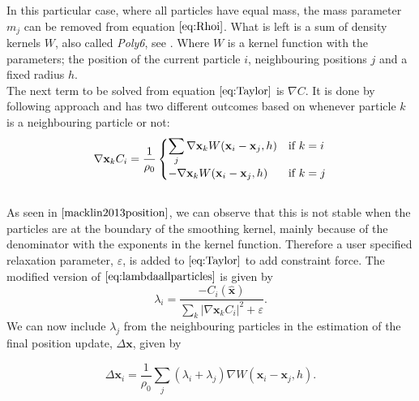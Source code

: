 In this particular case, where all particles have equal mass, the mass parameter $m_j$ can be removed from equation $\ref{eq:Rhoi}$. What is left is a sum of density kernels $W$, also called \textit{Poly6}, see \cite{macklin2013position}. Where $W$ is a kernel function with the parameters; the position of the current particle  $i$, neighbouring positions $j$ and a fixed radius $h$.
\\
The next term to be solved from equation $\ref{eq:Taylor}$ is $\nabla C$. It is done by following \cite{macklin2013position} approach and has two different outcomes based on whenever particle $k$ is a neighbouring particle or not:
\\
\begin{equation}
 \nabla \mathbf{x}_k C_i = \frac{1}{\rho_0}
  \begin{cases}
  \label{eq:NablaC}
   \displaystyle \sum\limits_{j} \nabla \mathbf{x}_k W(\mathbf{x}_i - \mathbf{x}_j, h) & $\text{if }$ k = i \\
   - \nabla \mathbf{x}_k W(\mathbf{x}_i - \mathbf{x}_j, h) & $\text{if }$ k = j \\
  \end{cases}
\end{equation}
\\
As seen in $\cite{macklin2013position}$, we can observe that this is not stable when the particles are at the boundary of the smoothing kernel, mainly because of the denominator with the exponents in the kernel function. 
Therefore a user specified relaxation parameter, $\varepsilon$, is added to $\ref{eq:Taylor}$ to add constraint force. The modified version of $\ref{eq:lambdaallparticles}$ is given by
\begin{equation}
\label{eq:LambdaEpsilon}
\lambda_i = \frac{- C_i(\hat{\mathbf{x}}) }{ \sum\limits_{k} |\nabla \mathbf{x}_k C_i|^2 + \varepsilon}.
\end{equation}
We can now include $\lambda_j$ from the neighbouring particles in the estimation of the final position update, $\Delta \mathbf{x}$, given by

\begin{equation}
\label{eq:DeltaP}
\Delta \mathbf{x}_i = \frac{1}{\rho_0} \sum\limits_{j} (\lambda_i + \lambda_j) \nabla W(\mathbf{x}_i - \mathbf{x}_j, h).
\end{equation}

